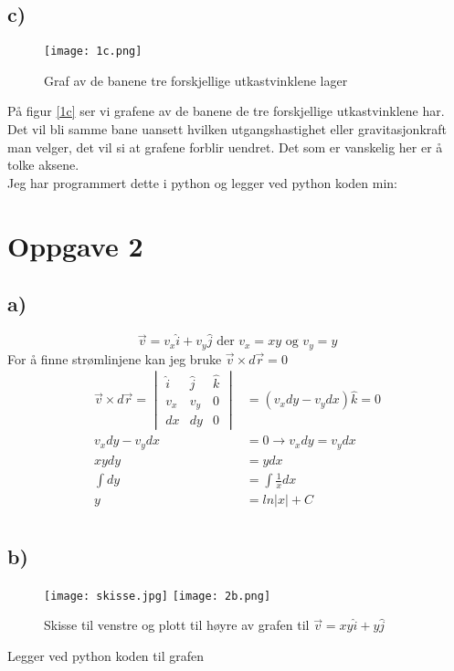 \documentclass[a4paper,12pt,norsk]{article}
\begin{document}
\subsection{c)}
\begin{figure}[h!]
\texttt{[image: 1c.png]} 
\caption{Graf av de banene tre forskjellige utkastvinklene lager}
\label{1c}
\end{figure} 
På figur \vref{1c} ser vi grafene av de banene de tre forskjellige utkastvinklene har. Det vil bli samme bane uansett hvilken utgangshastighet eller gravitasjonkraft man velger, det vil si at grafene forblir uendret. Det som er vanskelig her er å tolke aksene.\\
Jeg har programmert dette i python og legger ved python koden min:



\section{Oppgave 2}
\subsection{a)}
$$\vec{v} = v_x\hat{i} + v_y\hat{j} \textrm{ der } v_x = xy \textrm{ og } v_y = y$$
For å finne strømlinjene kan jeg bruke $\vec{v} \times d\vec{r} = 0$
\begin{align*}
\vec{v} \times d\vec{r} =
\begin{vmatrix}
\hat{i} & \hat{j} & \hat{k}\\
v_x & v_y & 0 \\
dx & dy & 0
\end{vmatrix}
&= (v_xdy - v_ydx)\hat{k} = 0\\
v_xdy - v_ydx &= 0 \rightarrow v_xdy = v_ydx \\
xy dy &= y dx \\
\int dy &= \int \frac{1}{x}dx\\
y &= ln|x| + C \\
\end{align*}


\subsection{b)}
\begin{figure}[h!]
\texttt{[image: skisse.jpg]} 
\texttt{[image: 2b.png]} 
\caption{Skisse til venstre og plott til høyre av grafen til $\vec{v} = xy\hat{i} + y\hat{j}$}
\label{2b}
\end{figure} 
Legger ved python koden til grafen

\end{document}
